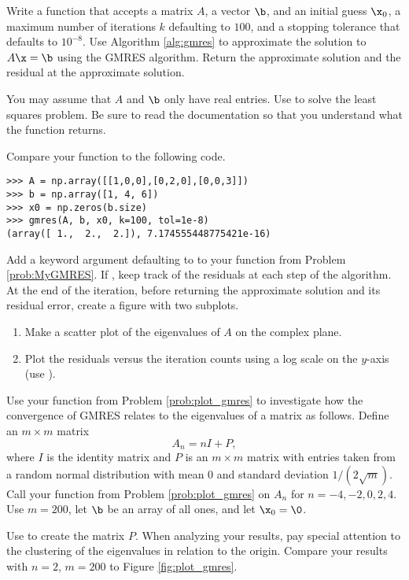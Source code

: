 
Write a function that accepts a matrix $A$, a vector $\b$, and an initial guess $\x_0$, a maximum number of iterations $k$ defaulting to $100$, and a stopping tolerance  that defaults to $10^{-8}$.
Use Algorithm \ref{alg:gmres} to approximate the solution to $A\x=\b$ using the GMRES algorithm.
Return the approximate solution and the residual at the approximate solution.

You may assume that $A$ and $\b$ only have real entries.
Use  to solve the least squares problem.
Be sure to read the documentation so that you understand what the function returns.

Compare your function to the following code.
\begin{lstlisting}
>>> A = np.array([[1,0,0],[0,2,0],[0,0,3]])
>>> b = np.array([1, 4, 6])
>>> x0 = np.zeros(b.size)
>>> gmres(A, b, x0, k=100, tol=1e-8)
(array([ 1.,  2.,  2.]), 7.174555448775421e-16)
\end{lstlisting}
\label{prob:MyGMRES}

\label{prob:plot_gmres}
Add a keyword argument  defaulting to  to your function from Problem \ref{prob:MyGMRES}.
If , keep track of the residuals at each step of the algorithm.
At the end of the iteration, before returning the approximate solution and its residual error, create a figure with two subplots.
\begin{enumerate}
\item Make a scatter plot of the eigenvalues of $A$ on the complex plane.
\item Plot the residuals versus the iteration counts using a log scale on the $y$-axis\\(use ).
\end{enumerate}

\label{prob:make_plots}
Use your function from Problem \ref{prob:plot_gmres} to investigate how the convergence of GMRES relates to the eigenvalues of a matrix as follows.
Define an $m\times m$ matrix
\[A_n = nI+P,\]
 where $I$ is the identity matrix and $P$ is an $m \times m$ matrix with entries taken from a random normal distribution with mean 0 and standard deviation $1/(2\sqrt{m})$.
 Call your function from Problem \ref{prob:plot_gmres} on $A_n$ for $n=-4,-2,0,2,4$.
 Use $m=200$, let $\b$ be an array of all ones, and let $\x_0 = \0$.

Use  to create the matrix $P$.
When analyzing your results, pay special attention to the clustering of the eigenvalues in relation to the origin.
Compare your results with $n=2$, $m=200$ to Figure \ref{fig:plot_gmres}.

